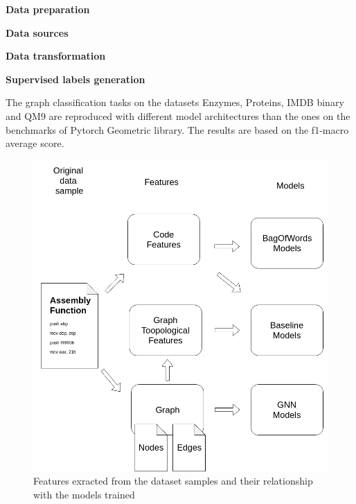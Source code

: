 \textbf{Data preparation}

\textbf{Data sources}

\textbf{Data transformation}





\textbf{Supervised labels generation}



The graph classification tasks on the datasets Enzymes, Proteins, IMDB binary and QM9 are reproduced with different model architectures than the ones on the benchmarks of Pytorch Geometric library. The results are based on the f1-macro average score.




\begin{figure}[H]
    \centering
        \includegraphics[width=0.65\linewidth]{img/Features_and_models_diagram.png}
    \caption{Features exracted from the dataset samples and their relationship with the models trained}\label{fig:Features_diagram}
\end{figure}



